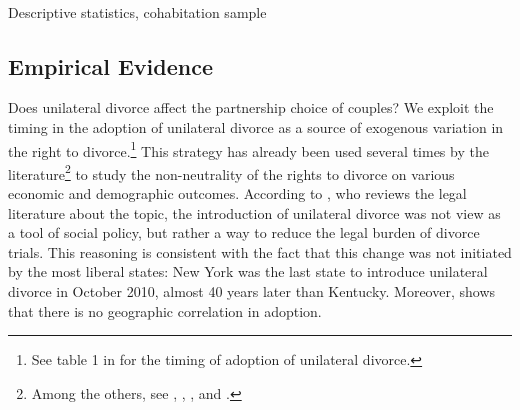 \documentclass[12pt]{article}
\numberwithin{table}{section}
\begin{document}
\begin{table}[!htbp]\centering
	\caption{\\Descriptive statistics, cohabitation sample}
	\label{table:sum_coh}
	
\end{table}
\FloatBarrier

\subsection{Empirical Evidence}\label{empirics}
Does unilateral divorce affect the partnership choice of couples? We exploit the timing in the adoption of unilateral divorce as a source of exogenous variation in the right to divorce.\footnote{See table 1 in \cite{ciacci2017} for the timing of adoption of unilateral divorce.} This strategy has already been used several times by the literature\footnote{Among the others, see \cite{wolfers2006}, \cite{stevenson2008}, \cite{voena2015}, \cite{reynoso2019} and \cite{ciacci2017}.} to study the non-neutrality of the rights to divorce on various economic and demographic outcomes. According to \cite{gruber2004}, who reviews the legal literature about the topic, the introduction of unilateral divorce was not view as a tool of social policy, but rather a way to reduce the legal burden of divorce trials. This reasoning is consistent with the fact that this change was not initiated by the most liberal states: New York was the last state to introduce unilateral divorce in October 2010, almost 40 years later than Kentucky. Moreover, \cite{reynoso2019} shows that there is no geographic correlation in adoption. 
\end{document}
